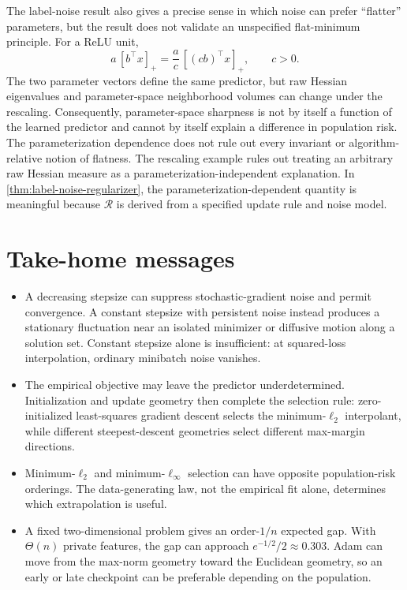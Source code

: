 \documentclass[11pt,twoside]{article}
\theoremstyle{definition}
\theoremstyle{remark}
\begin{document}
The label-noise result also gives a precise sense in which noise can prefer
``flatter'' parameters, but the result does not validate an unspecified
flat-minimum principle.
For a ReLU unit,
\begin{equation}
 a\,[b^\top x]_+
 =\frac ac\,[(cb)^\top x]_+,
 \qquad c>0.
 \label{eq:relu-rescaling}
\end{equation}
The two parameter vectors define the same predictor, but raw Hessian
eigenvalues and parameter-space neighborhood volumes can change under the
rescaling. Consequently, parameter-space sharpness is not by itself a
function of the learned predictor and cannot by itself explain a difference
in population risk. The parameterization dependence does not rule out every invariant or
algorithm-relative notion of flatness. The rescaling example rules out
treating an arbitrary raw Hessian measure as a parameterization-independent
explanation. In
\cref{thm:label-noise-regularizer}, the parameterization-dependent quantity is
meaningful because $\mathcal R$ is derived from a specified update rule and noise model.

\section{Take-home messages}
\label{sec:take-home}

\begin{itemize}[leftmargin=*]
\item A decreasing stepsize can suppress stochastic-gradient noise and permit
convergence. A constant stepsize with persistent noise instead produces a
stationary fluctuation near an isolated minimizer or diffusive motion along a
solution set. Constant stepsize alone is insufficient: at squared-loss
interpolation, ordinary minibatch noise vanishes.
\item The empirical objective may leave the predictor underdetermined.
Initialization and update geometry then complete the selection rule: zero-initialized
least-squares gradient descent selects the minimum-$\ell_2$ interpolant, while
different steepest-descent geometries select different max-margin directions.
\item Minimum-$\ell_2$ and minimum-$\ell_\infty$ selection can have opposite
population-risk orderings. The data-generating law, not the empirical fit
alone, determines which extrapolation is useful.
\item A fixed two-dimensional problem gives an order-$1/n$ expected gap. With
$\Theta(n)$ private features, the gap can approach
$e^{-1/2}/2\approx0.303$. Adam can move
from the max-norm geometry toward the Euclidean geometry, so an early or late
checkpoint can be preferable depending on the population.
\end{itemize}
\end{document}
